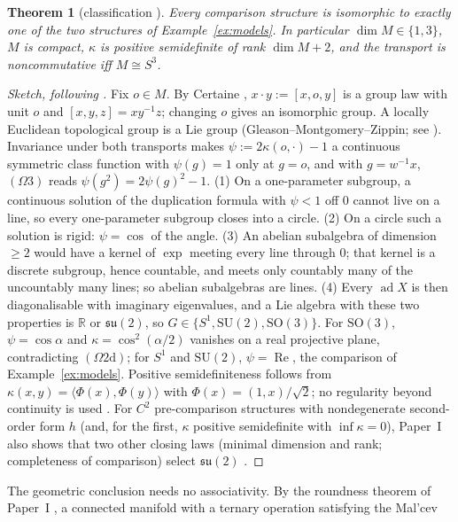 \documentclass[aps,pra,onecolumn,superscriptaddress,nofootinbib,10pt]{revtex4-2}
\newtheorem{theorem}{Theorem}
\theoremstyle{definition}
\theoremstyle{remark}
\newcommand{\R}{\mathbb{R}}
\newcommand{\su}{\mathfrak{su}}
\newcommand{\ad}{\operatorname{ad}}
\newcommand{\re}{\operatorname{Re}}
\newcommand{\ip}[2]{\langle #1,#2\rangle}
\newcommand{\hp}[3]{[#1,#2,#3]}
\newcommand{\SU}{\mathrm{SU}}
\newcommand{\SO}{\mathrm{SO}}
\begin{document}
\begin{theorem}[classification {\cite[Thms.~3.1, 3.11]{PaperI}}]\label{thm:main}
Every comparison structure is isomorphic to exactly one of the two structures of
Example~\ref{ex:models}.  In particular $\dim M\in\{1,3\}$, $M$ is compact, $\kappa$ is positive
semidefinite of rank $\dim M+2$, and the transport is noncommutative iff $M\cong S^3$.
\end{theorem}

\begin{proof}[Sketch, following {\cite[Thm.~3.11]{PaperI}}]
Fix $o\in M$.  By Certaine \cite{Certaine}, $x\cdot y:=\hp{x}{o}{y}$ is a group law with unit $o$ and
$\hp{x}{y}{z}=xy^{-1}z$; changing $o$ gives an isomorphic group.  A locally Euclidean topological group
is a Lie group (Gleason--Montgomery--Zippin; see \cite[Lemma~2.2]{PaperI}).  Invariance under both transports makes
$\psi:=2\kappa(o,\cdot)-1$ a continuous symmetric class function with $\psi(g)=1$ only at $g=o$, and with
$g=w^{-1}x$, $(\Omega3)$ reads $\psi(g^2)=2\psi(g)^2-1$.  (1) On a one-parameter subgroup, a continuous
solution of the duplication formula with $\psi<1$ off $0$ cannot live on a line, so every one-parameter
subgroup closes into a circle.  (2) On a circle such a solution is rigid: $\psi=\cos$ of the angle.
(3) An abelian subalgebra of dimension $\ge2$ would have a kernel of $\exp$ meeting every line through
$0$; that kernel is a discrete subgroup, hence countable, and meets only countably many of the
uncountably many lines; so abelian subalgebras are lines.  (4) Every $\ad X$ is then
diagonalisable with imaginary eigenvalues, and a Lie algebra with these two properties is $\R$ or
$\su(2)$, so $G\in\{S^1,\SU(2),\SO(3)\}$.  For $\SO(3)$, $\psi=\cos\alpha$ and $\kappa=\cos^2(\alpha/2)$ vanishes on a
real projective plane, contradicting $(\Omega2\mathrm d)$; for $S^1$ and $\SU(2)$, $\psi=\re$, the comparison of
Example~\ref{ex:models}.  Positive semidefiniteness follows from $\kappa(x,y)=\ip{\Phi(x)}{\Phi(y)}$ with
$\Phi(x)=(1,x)/\sqrt2$; no regularity beyond continuity is used \cite[Thms.~3.1, 3.11]{PaperI}.  For $C^2$
pre-comparison structures with nondegenerate second-order form $h$ (and, for the first, $\kappa$ positive
semidefinite with $\inf\kappa=0$), Paper~I also shows that two other closing laws (minimal dimension and
rank; completeness of comparison) select $\su(2)$ \cite[Thms.~4.1, 4.2]{PaperI}.
\end{proof}
The geometric conclusion needs no associativity.  By the roundness theorem of Paper~I
\cite[Thm.~5.18, Cor.~5.19]{PaperI}, a connected manifold with a ternary operation satisfying the Mal'cev
\end{document}
